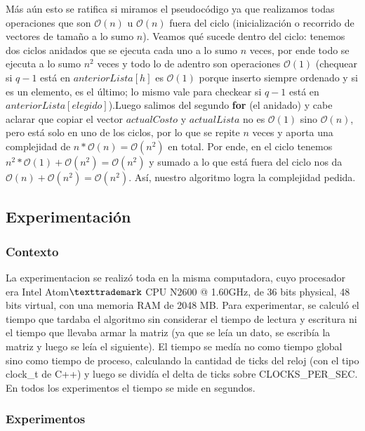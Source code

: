 \documentclass[A4paper,oneside,fleqn,11pt]{article}
\theoremstyle{definition}
\begin{document}
Más aún esto se ratifica si miramos el pseudocódigo ya que realizamos todas operaciones que son $\mathcal{O}(n)$ u $\mathcal{O}(n)$ fuera del ciclo (inicialización o recorrido de vectores de tamaño a lo sumo $n$). Veamos qué sucede dentro del ciclo: tenemos dos ciclos anidados que se ejecuta cada uno a lo sumo $n$ veces, por ende todo se ejecuta a lo sumo $n^2$ veces y todo lo de adentro son operaciones $\mathcal{O}(1)$ (chequear si $q-1$ está en $anteriorLista[h]$ es $\mathcal{O}(1)$ porque inserto siempre ordenado y si es un elemento, es el último; lo mismo vale para checkear si $q-1$ está en $anteriorLista[elegido]$).Luego salimos del segundo \textbf{for} (el anidado) y cabe aclarar que copiar el vector $actualCosto$ y $actualLista$ no es $\mathcal{O}(1)$ sino $\mathcal{O}(n)$, pero está solo en uno de los ciclos, por lo que se repite $n$ veces y aporta una complejidad de $n* \mathcal{O}(n)= \mathcal{O}(n^2)$ en total. Por ende, en el ciclo tenemos $n^2 *\mathcal{O}(1)+ \mathcal{O}(n^2) = \mathcal{O}(n^2)$ y sumado a lo que está fuera del ciclo nos da $\mathcal{O}(n)+ \mathcal{O}(n^2) = \mathcal{O}(n^2)$. Así, nuestro algoritmo logra la complejidad pedida.

\subsection{Experimentación}


\subsubsection{Contexto}

La experimentacion se realizó toda en la misma computadora, cuyo procesador era Intel Atom$\texttrademark$ CPU N2600 @ 1.60GHz, de 36 bits physical, 48 bits virtual, con una memoria RAM de 2048 MB.  Para experimentar, se calculó el tiempo que tardaba el algoritmo sin considerar el tiempo de lectura y escritura ni el tiempo que llevaba armar la matriz (ya que se leía un dato, se escribía la matriz y luego se leía el siguiente). 
El tiempo se medía no como tiempo global sino como tiempo de proceso, calculando la cantidad de ticks del reloj (con el tipo clock\_t de C++) y luego se dividía el delta de ticks sobre CLOCKS\_PER\_SEC. En todos los experimentos el tiempo se mide en segundos. 

\subsubsection{Experimentos}
\end{document}
